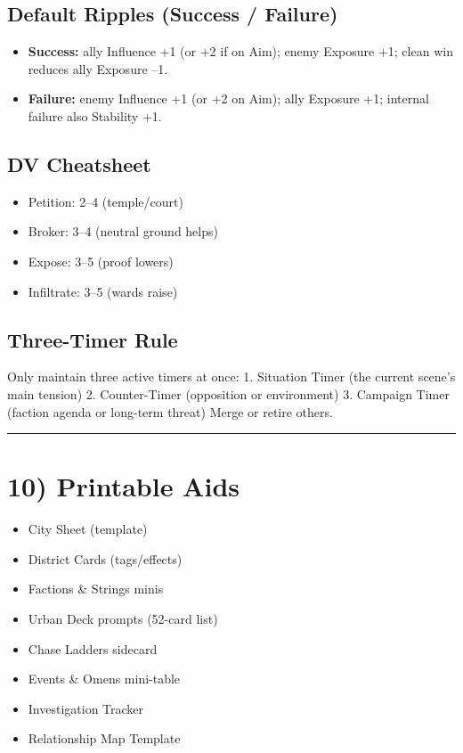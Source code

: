 \documentclass[11pt]{article}
\newcommand{\sectionrule}{\vspace{0.5em}\noindent\textcolor{gray}{\rule{\textwidth}{0.4pt}}\par\vspace{0.5em}}
\begin{document}
\subsection*{Default Ripples (Success / Failure)}
\begin{itemize}
    \item \textbf{Success:} ally Influence +1 (or +2 if on Aim); enemy Exposure +1; clean win reduces ally Exposure --1.
    \item \textbf{Failure:} enemy Influence +1 (or +2 on Aim); ally Exposure +1; internal failure also Stability +1.
\end{itemize}

\subsection*{DV Cheatsheet}
\begin{itemize}
    \item Petition: 2--4 (temple/court)
    \item Broker: 3--4 (neutral ground helps)
    \item Expose: 3--5 (proof lowers)
    \item Infiltrate: 3--5 (wards raise)
\end{itemize}

\subsection*{Three-Timer Rule}
Only maintain three active timers at once:  
1. Situation Timer (the current scene's main tension)  
2. Counter-Timer (opposition or environment)  
3. Campaign Timer (faction agenda or long-term threat)  
Merge or retire others.

\sectionrule

\section*{10) Printable Aids}
\begin{itemize}
    \item City Sheet (template)
    \item District Cards (tags/effects)
    \item Factions \& Strings minis
    \item Urban Deck prompts (52-card list)
    \item Chase Ladders sidecard
    \item Events \& Omens mini-table
    \item Investigation Tracker
    \item Relationship Map Template
\end{itemize}
\end{document}
